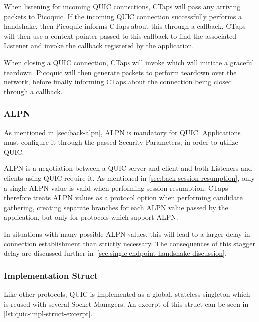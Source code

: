 When listening for incoming QUIC connections, CTaps will 
pass any arriving packets to Picoquic.
If the incoming QUIC connection successfully performs a handshake, then 
Picoquic informs CTaps about this through a callback. CTaps will then
use a context pointer passed to this callback to find the associated
Listener and invoke the  callback registered by the
application.

When closing a QUIC connection, CTaps will invoke
 which will initiate a graceful teardown.
Picoquic will then generate packets to perform teardown over the network,
before finally informing CTaps about the connection being closed through a
callback.

\subsubsection{ALPN}
As mentioned in \cref{sec:back-alpn}, ALPN is mandatory for QUIC.
Applications must configure it through the passed Security Parameters, in order to utilize QUIC.

ALPN is a negotiation between a QUIC server and client and both Listeners and
clients using QUIC require it. As mentioned in \cref{sec:back-session-resumption},
only a single ALPN value is valid when performing session resumption. CTaps
therefore treats ALPN values as a protocol option when performing candidate
gathering, creating separate branches for each ALPN value passed by the application,
but only for protocols which support ALPN.

In situations with many possible ALPN values, this
will lead to a larger delay in connection establishment than strictly
necessary. The consequences of this stagger delay are discussed further in~\cref{sec:single-endpoint-handshake-discussion}.

\subsubsection{Implementation Struct}
Like other protocols, QUIC is implemented
as a global, stateless singleton which is reused
with several Socket Managers. An excerpt of this
struct can be seen in \cref{lst:quic-impl-struct-excerpt}.

